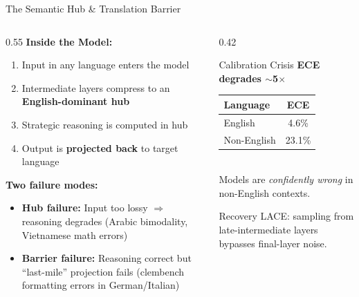 \documentclass[11pt,aspectratio=169]{beamer}
\begin{document}
\begin{frame}{The Semantic Hub \& Translation Barrier}
    \begin{columns}[T]
        \begin{column}{0.55\textwidth}
            \textbf{Inside the Model:}
            \begin{enumerate}
                \item Input in any language enters the model
                \item Intermediate layers compress to an \textbf{English-dominant hub}
                \item Strategic reasoning is computed in hub
                \item Output is \textbf{projected back} to target language
            \end{enumerate}
            \vspace{0.2cm}
            \textbf{Two failure modes:}
            \begin{itemize}
                \item \textcolor{highlightred}{\textbf{Hub failure:}} Input too lossy $\Rightarrow$ reasoning degrades (Arabic bimodality, Vietnamese math errors)
                \item \textcolor{warnorange}{\textbf{Barrier failure:}} Reasoning correct but ``last-mile'' projection fails (clembench formatting errors in German/Italian)
            \end{itemize}
        \end{column}
        \begin{column}{0.42\textwidth}
            \begin{block}{Calibration Crisis}
                \centering
                \textbf{ECE degrades $\sim$5$\times$}\\[6pt]
                \begin{tabular}{lc}
                    \toprule
                    \textbf{Language} & \textbf{ECE} \\
                    \midrule
                    English & 4.6\% \\
                    Non-English & 23.1\% \\
                    \bottomrule
                \end{tabular}\\[8pt]
                {\small Models are \textit{confidently wrong} in non-English contexts.}
            \end{block}
            \vspace{0.2cm}
            \begin{block}{Recovery}
                {\small LACE: sampling from late-intermediate layers bypasses final-layer noise.}
            \end{block}
        \end{column}
    \end{columns}
\end{frame}
\end{document}
